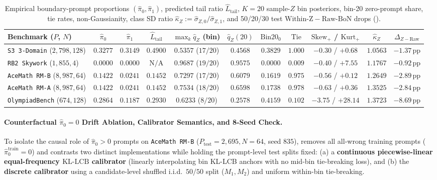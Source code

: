 \documentclass[10pt]{article}
\theoremstyle{plain}
\theoremstyle{definition}
\theoremstyle{remark}
\begin{document}
\begin{table}[tbp]
\centering
\caption{Empirical boundary-prompt proportions $(\hat{\pi}_0, \hat{\pi}_1)$, predicted tail ratio $\hat{L}_{\mathrm{tail}}$, $K=20$ sample-$Z$ bin posteriors, bin-20 zero-prompt share, tie rates, non-Gaussianity, class SD ratio $\hat{\kappa}_Z := \hat{\sigma}_{Z,0}/\hat{\sigma}_{Z,1}$, and 50/20/30 test $\mathrm{Within\text{-}Z} - \mathrm{Raw\text{-}BoN}$ drops ().}
\label{tab:z-boundary-audit}
\scriptsize
\setlength{\tabcolsep}{2.8pt}
\begin{tabular}{lcccccccccc}
\toprule
Benchmark ($P$, $N$) & $\hat{\pi}_0$ & $\hat{\pi}_1$ & $\hat{L}_{\mathrm{tail}}$ & $\max_k \hat{q}_Z$ (bin) & $\hat{q}_Z(20)$ & $\mathrm{Bin20}_0$ & $\mathrm{Tie}$ & $\mathrm{Skew}_+$ / $\mathrm{Kurt}_+$ & $\hat{\kappa}_Z$ & $\Delta_{Z-\mathrm{Raw}}$ \\
\midrule
\texttt{S3 3-Domain} ($2{,}798, 128$)    & $0.3277$ & $0.3149$ & $0.4900$ & $0.5357$ ($17/20$) & $0.4568$ & $0.3829$ & $1.000$ & $-0.30$ / $+0.68$  & $1.0563$ & $-1.37\,\mathrm{pp}$ \\
\texttt{RB2 Skywork} ($1{,}855, 4$)      & $0.0000$ & $0.0000$ & $\text{N/A}$ & $0.9687$ ($19/20$) & $0.9575$ & $0.0000$ & $0.009$ & $-0.40$ / $+7.55$  & $1.1767$ & $-0.92\,\mathrm{pp}$ \\
\texttt{AceMath RM-B} ($8{,}987, 64$)    & $0.1422$ & $0.0241$ & $0.1452$ & $0.7297$ ($17/20$) & $0.6079$ & $0.1619$ & $0.975$ & $-0.56$ / $+0.12$  & $1.2649$ & $-2.89\,\mathrm{pp}$ \\
\texttt{AceMath RM-A} ($8{,}987, 64$)    & $0.1422$ & $0.0241$ & $0.1452$ & $0.7534$ ($18/20$) & $0.6598$ & $0.1738$ & $0.978$ & $-0.63$ / $+0.36$  & $1.3525$ & $-2.84\,\mathrm{pp}$ \\
\texttt{OlympiadBench} ($674, 128$)      & $0.2864$ & $0.1187$ & $0.2930$ & $0.6233$ ($8/20$)  & $0.2578$ & $0.4159$ & $0.102$ & $-3.75$ / $+28.14$ & $1.3723$ & $-8.69\,\mathrm{pp}$ \\
\bottomrule
\end{tabular}
\end{table}

\paragraph{Counterfactual $\hat{\pi}_0 = 0$ Drift Ablation, Calibrator Semantics, and 8-Seed Check.}
To isolate the causal role of $\hat{\pi}_0 > 0$ prompts on \texttt{AceMath RM-B} ($P_{\mathrm{test}}=2{,}695, N=64$, seed $835$),  removes all all-wrong training prompts ($\hat{\pi}_0^{\mathrm{train}} = 0$) and contrasts two distinct implementations while holding the prompt-level test splits fixed: (a) a \textbf{continuous piecewise-linear equal-frequency $\mathrm{KL\text{-}LCB}$ calibrator} (linearly interpolating bin KL-LCB anchors with no mid-bin tie-breaking loss), and (b) the \textbf{discrete  calibrator} using a candidate-level shuffled i.i.d.\ $50/50$ split ($M_1, M_2$) and uniform within-bin tie-breaking.
\end{document}
